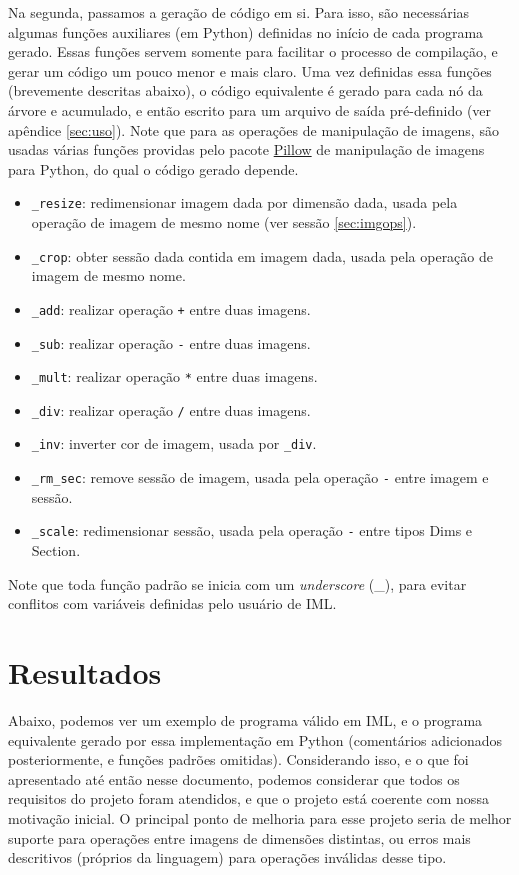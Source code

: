 \documentclass{article}
\begin{document}
Na segunda, passamos a geração de código em si. Para isso, são necessárias algumas funções auxiliares (em Python) definidas no início de cada programa gerado. Essas funções servem somente para facilitar o processo de compilação, e gerar um código um pouco menor e mais claro. Uma vez definidas essa funções (brevemente descritas abaixo), o código equivalente é gerado para cada nó da árvore e acumulado, e então escrito para um arquivo de saída pré-definido (ver apêndice \ref{sec:uso}). Note que para as operações de manipulação de imagens, são usadas várias funções providas pelo pacote \href{https://python-pillow.org/}{Pillow} de manipulação de imagens para Python, do qual o código gerado depende.

\begin{itemize}
\item \texttt{\_resize}: redimensionar imagem dada por dimensão dada, usada pela operação de imagem de mesmo nome (ver sessão \ref{sec:imgops}).
\item \texttt{\_crop}: obter sessão dada contida em imagem dada, usada pela operação de imagem de mesmo nome.
\item \texttt{\_add}: realizar operação \texttt{+} entre duas imagens.
\item \texttt{\_sub}: realizar operação \texttt{-} entre duas imagens.
\item \texttt{\_mult}: realizar operação \texttt{*} entre duas imagens.
\item \texttt{\_div}: realizar operação \texttt{/} entre duas imagens.
\item \texttt{\_inv}: inverter cor de imagem, usada por \texttt{\_div}.
\item \texttt{\_rm\_sec}: remove sessão de imagem, usada pela operação \texttt{-} entre imagem e sessão.
\item \texttt{\_scale}: redimensionar sessão, usada pela operação \texttt{-} entre tipos Dims e Section.
\end{itemize}

Note que toda função padrão se inicia com um \textit{underscore} (\_), para evitar conflitos com variáveis definidas pelo usuário de IML.

\section{Resultados}
\label{sec:resultados}
Abaixo, podemos ver um exemplo de programa válido em IML, e o programa equivalente gerado por essa implementação em Python (comentários adicionados posteriormente, e funções padrões omitidas). Considerando isso, e o que foi apresentado até então nesse documento, podemos considerar que todos os requisitos do projeto foram atendidos, e que o projeto está coerente com nossa motivação inicial. O principal ponto de melhoria para esse projeto seria de melhor suporte para operações entre imagens de dimensões distintas, ou erros mais descritivos (próprios da linguagem) para operações inválidas desse tipo. 
\end{document}
